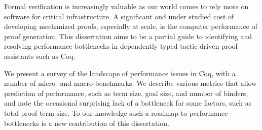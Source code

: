 %
%
%
%
%
%
Formal verification is increasingly valuable as our world comes to rely more on software for critical infrastructure.
A significant and under studied cost of developing mechanized proofs, especially at scale, is the computer performance of proof generation.
This dissertation aims to be a partial guide to identifying and resolving performance bottlenecks in dependently typed tactic-driven proof assistants such as Coq.

We present a survey of the landscape of performance issues in Coq, with a number of micro- and macro-benchmarks.
We describe various metrics that allow prediction of performance, such as term size, goal size, and number of binders, and note the occasional surprising lack of a bottleneck for some factors, such as total proof term size.
To our knowledge such a roadmap to performance bottlenecks is a new contribution of this dissertation.

